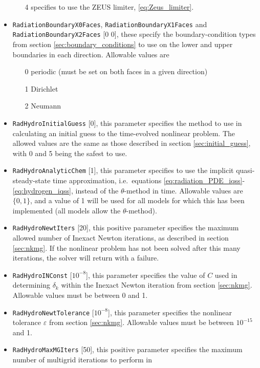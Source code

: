 \documentclass[letterpaper,10pt]{article}
\renewcommand{\(}{\left(}
\renewcommand{\)}{\right)}
\begin{document}
\begin{itemize}
\begin{itemize}
  \item[4] specifies to use the ZEUS limiter, \eqref{eq:Zeus_limiter}.
  \end{itemize}
\item {\tt RadiationBoundaryX0Faces}, {\tt RadiationBoundaryX1Faces}
  and {\tt RadiationBoundaryX2Faces} [0 0], these specify the
  boundary-condition types from section \ref{sec:boundary_conditions}
  to use on the lower and upper boundaries in each direction.
  Allowable values are
  \begin{itemize}
  \item[0] periodic (must be set on both faces in a given direction)
  \item[1] Dirichlet
  \item[2] Neumann
  \end{itemize}
\item {\tt RadHydroInitialGuess} [0], this parameter specifies the
  method to use in calculating an initial guess to the time-evolved
  nonlinear problem.  The allowed values are the same as those
  described in section \ref{sec:initial_guess}, with 0 and 5 being the
  safest to use.
\item {\tt RadHydroAnalyticChem} [1], this parameter specifies to use
  the implicit quasi-steady-state time approximation, i.e.~equations
  \eqref{eq:radiation_PDE_iqss}-\eqref{eq:hydrogen_iqss}, instead of
  the $\theta$-method in time.  Allowable values are $\{0,1\}$, and a
  value of 1 will be used for all models for which this has been
  implemented (all models allow the $\theta$-method).
\item {\tt RadHydroNewtIters} [20], this positive parameter specifies
  the maximum allowed number of Inexact Newton iterations, as
  described in section \ref{sec:nkmg}.  If the nonlinear problem has
  not been solved after this many iterations, the solver will return
  with a failure. 
\item {\tt RadHydroINConst} [$10^{-8}$], this parameter specifies
  the value of $C$ used in determining $\delta_k$ within the Inexact
  Newton iteration from section \ref{sec:nkmg}.  Allowable values must
  be between 0 and 1.
\item {\tt RadHydroNewtTolerance} [$10^{-8}$], this parameter
  specifies the nonlinear tolerance $\varepsilon$ from section
  \ref{sec:nkmg}.  Allowable values must be between $10^{-15}$ and 1.
\item {\tt RadHydroMaxMGIters} [50], this positive parameter
  specifies the maximum number of multigrid iterations to perform in

\end{itemize}
\end{document}
